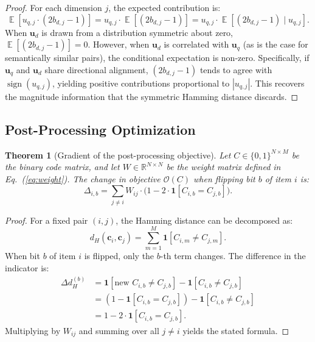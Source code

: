 \documentclass[11pt,a4paper]{article}
\newtheorem{theorem}{Theorem}
\DeclareMathOperator{\sign}{sign}
\DeclareMathOperator{\E}{\mathbb{E}}
\begin{document}
\begin{proof}
For each dimension $j$, the expected contribution is:
\begin{equation}
    \E[u_{q,j} \cdot (2b_{d,j}-1)] = u_{q,j} \cdot \E[(2b_{d,j}-1)] = u_{q,j} \cdot \E[(2b_{d,j}-1) \mid u_{q,j}].
\end{equation}
When $\mathbf{u}_d$ is drawn from a distribution symmetric about zero, $\E[(2b_{d,j}-1)] = 0$. However, when $\mathbf{u}_d$ is correlated with $\mathbf{u}_q$ (as is the case for semantically similar pairs), the conditional expectation is non-zero. Specifically, if $\mathbf{u}_q$ and $\mathbf{u}_d$ share directional alignment, $(2b_{d,j}-1)$ tends to agree with $\sign(u_{q,j})$, yielding positive contributions proportional to $|u_{q,j}|$. This recovers the magnitude information that the symmetric Hamming distance discards.
\end{proof}

\subsection{Post-Processing Optimization}

\begin{theorem}[Gradient of the post-processing objective]\label{thm:post-grad}
Let $C \in \{0,1\}^{N \times M}$ be the binary code matrix, and let $W \in \mathbb{R}^{N \times N}$ be the weight matrix defined in Eq.~(\ref{eq:weight}). The change in objective $\mathcal{O}(C)$ when flipping bit $b$ of item $i$ is:
\begin{equation}
    \Delta_{i,b} = \sum_{j \neq i} W_{ij} \cdot \bigl(1 - 2\cdot\mathbf{1}[C_{i,b} = C_{j,b}]\bigr).
\end{equation}
\end{theorem}

\begin{proof}
For a fixed pair $(i,j)$, the Hamming distance can be decomposed as:
\begin{equation}
    d_H(\mathbf{c}_i, \mathbf{c}_j) = \sum_{m=1}^{M} \mathbf{1}[C_{i,m} \neq C_{j,m}].
\end{equation}
When bit $b$ of item $i$ is flipped, only the $b$-th term changes. The difference in the indicator is:
\begin{align}
    \Delta d_H^{(b)} &= \mathbf{1}[\text{new } C_{i,b} \neq C_{j,b}] - \mathbf{1}[C_{i,b} \neq C_{j,b}] \\
    &= (1 - \mathbf{1}[C_{i,b} = C_{j,b}]) - \mathbf{1}[C_{i,b} \neq C_{j,b}] \\
    &= 1 - 2\cdot\mathbf{1}[C_{i,b} = C_{j,b}].
\end{align}
Multiplying by $W_{ij}$ and summing over all $j \neq i$ yields the stated formula.
\end{proof}
\end{document}
